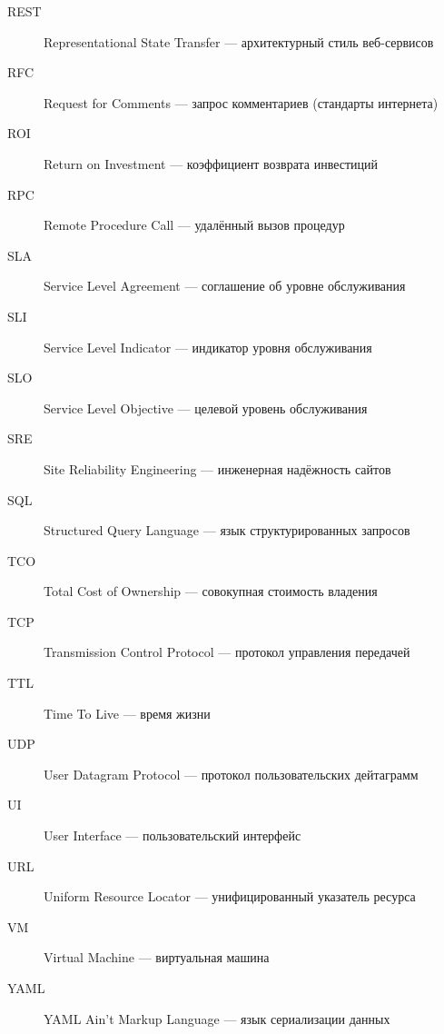 \begin{description}
    \item[REST] Representational State Transfer — архитектурный стиль веб-сервисов
    \item[RFC] Request for Comments — запрос комментариев (стандарты интернета)
    \item[ROI] Return on Investment — коэффициент возврата инвестиций
    \item[RPC] Remote Procedure Call — удалённый вызов процедур
    \item[SLA] Service Level Agreement — соглашение об уровне обслуживания
    \item[SLI] Service Level Indicator — индикатор уровня обслуживания
    \item[SLO] Service Level Objective — целевой уровень обслуживания
    \item[SRE] Site Reliability Engineering — инженерная надёжность сайтов
    \item[SQL] Structured Query Language — язык структурированных запросов
    \item[TCO] Total Cost of Ownership — совокупная стоимость владения
    \item[TCP] Transmission Control Protocol — протокол управления передачей
    \item[TTL] Time To Live — время жизни
    \item[UDP] User Datagram Protocol — протокол пользовательских дейтаграмм
    \item[UI] User Interface — пользовательский интерфейс
    \item[URL] Uniform Resource Locator — унифицированный указатель ресурса
    \item[VM] Virtual Machine — виртуальная машина
    \item[YAML] YAML Ain't Markup Language — язык сериализации данных
\end{description}

\newpage
